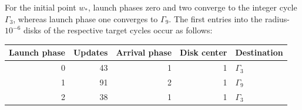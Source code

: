 \begin{proposition}
\label{prop:complex-phase-dependence}
For the initial point $w_*$, launch phases zero and two converge
to the integer cycle $\Gamma_3$, whereas launch phase one converges
to $\Gamma_9$. The first entries into the radius-$10^{-6}$ disks
of the respective target cycles occur as follows:
\begin{center}
\begin{tabular}{rrrrl}\toprule
Launch phase&Updates&Arrival phase&Disk center&Destination\\\midrule
0&43&1&1&$\Gamma_3$\\
1&91&2&1&$\Gamma_9$\\
2&38&1&1&$\Gamma_3$\\\bottomrule
\end{tabular}
\end{center}
\end{proposition}
